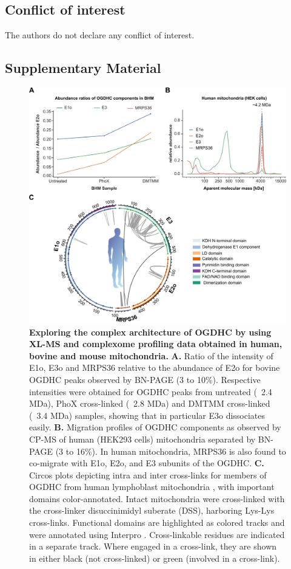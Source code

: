 \subsection*{Conflict of interest}
The authors do not declare any conflict of interest.
%
\clearpage
\begin{subappendices}
    \section{Supplementary Material}
    \begin{figure}[hbt!]
        \center
        \includegraphics[]{Chapter.5/Figures/SI_Figure1.png}
        \caption{\textbf{Exploring the complex architecture of OGDHC by using XL-MS and complexome profiling data obtained in human, bovine and mouse mitochondria.} \textbf{A.} Ratio of the intensity of E1o, E3o and MRPS36 relative to the abundance of E2o for bovine OGDHC peaks observed by BN-PAGE (3 to 10\%). Respective intensities were obtained for OGDHC peaks from untreated (~2.4 MDa), PhoX cross-linked (~2.8 MDa) and DMTMM cross-linked (~3.4 MDa) samples, showing that in particular E3o dissociates easily. \textbf{B.} Migration profiles of OGDHC components as observed by CP-MS of human (HEK293 cells) mitochondria separated by BN-PAGE (3 to 16\%). In human mitochondria, MRPS36 is also found to co-migrate with E1o, E2o, and E3 subunits of the OGDHC. \textbf{C.} Circos plots depicting intra and inter cross-links for members of OGDHC from human lymphoblast mitochondria \cite{Ryl_2020}, with important domains color-annotated. Intact mitochondria were cross-linked with the cross-linker disuccinimidyl suberate (DSS), harboring Lys-Lys cross-links. Functional domains are highlighted as colored tracks and were annotated using Interpro \cite{Blum_2021}. Cross-linkable residues are indicated in a separate track. Where engaged in a cross-link, they are shown in either black (not cross-linked) or green (involved in a cross-link).}

\end{figure}
\end{subappendices}
